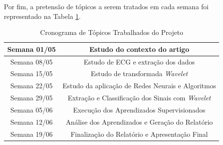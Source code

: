 \documentclass[conference]{IEEEtran}
\begin{document}
Por fim, a pretensão de tópicos a serem tratados em cada semana foi representado na Tabela \ref{table:cronogramaProjeto}.

%

\renewcommand\tablename{TABELA}
\begin{table}[!h]
\renewcommand{\arraystretch}{1.3}
\caption{Cronograma de Tópicos Trabalhados do Projeto}
\label{table:cronogramaProjeto}
\centering
\begin{tabular}{|c|c|}
\hline
Semana 01/05 & Estudo do contexto do artigo\\
\hline
Semana 08/05 & Estudo de ECG e extração dos dados\\
\hline
Semana 15/05 & Estudo de transformada \textit{Wavelet}\\
\hline
Semana 22/05 & Estudo da aplicação de Redes Neurais e Algoritmos\\
\hline
Semana 29/05 & Extração e Classificação dos Sinais com \textit{Wavelet}\\
\hline
Semana 05/06 & Execução dos Aprendizados Supervisionados\\
\hline
Semana 12/06 & Análise dos Aprendizados e Geração do Relatório\\
\hline
Semana 19/06 & Finalização do Relatório e Apresentação Final\\
\hline
\end{tabular}
\end{table}

\end{document}
